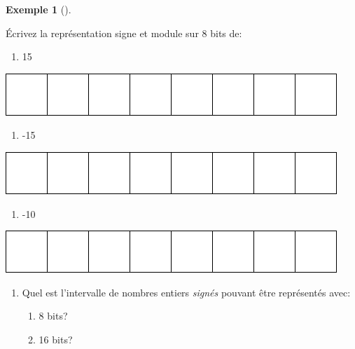 \documentclass[
  letterpaper,
]{scrbook}
\providecommand{\tightlist}{%
  \setlength{\itemsep}{0pt}\setlength{\parskip}{0pt}}\usepackage{longtable,booktabs,array}
\theoremstyle{plain}
\theoremstyle{definition}
\newtheorem{example}{Exemple}[chapter]
\theoremstyle{definition}
\theoremstyle{remark}
\begin{document}
\leavevmode{}%
\begin{example}[]\label{exm-representation-signe-module-8-bits}

Écrivez la représentation signe et module sur 8 bits de:

\begin{enumerate}
\def\labelenumi{\alph{enumi})}
\tightlist
\item
  15
\end{enumerate}

\includegraphics{./systeme_numeration_files/figure-pdf/unnamed-chunk-4-1.pdf}

\begin{enumerate}
\def\labelenumi{\alph{enumi})}
\tightlist
\item
  -15
\end{enumerate}

\includegraphics{./systeme_numeration_files/figure-pdf/unnamed-chunk-5-1.pdf}

\begin{enumerate}
\def\labelenumi{\alph{enumi})}
\tightlist
\item
  -10
\end{enumerate}

\includegraphics{./systeme_numeration_files/figure-pdf/unnamed-chunk-6-1.pdf}

\begin{enumerate}
\def\labelenumi{\alph{enumi})}
\tightlist
\item
  Quel est l'intervalle de nombres entiers \emph{signés} pouvant être
  représentés avec:

  \begin{enumerate}
  \def\labelenumii{\roman{enumii}.}
  \tightlist
  \item
    8 bits?
  \item
    16 bits?
  \end{enumerate}
\end{enumerate}

\end{example}
\end{document}
